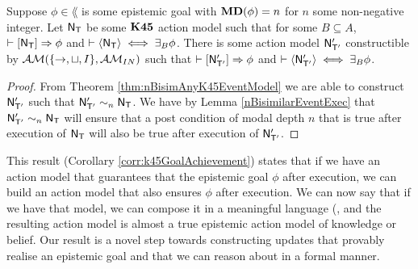 \begin{corr} \label{corr:k45GoalAchievement}
  Suppose $\phi \in \lang$ is some epistemic goal with ${\bf MD}(\phi) = n$ for $n$
  some non-negative integer.
  Let $\mathrm{\mathsf{N}}_\mathrm{\mathsf{T}}$ be some $\bf K45$ action model such that for some $B
  \subseteq A$, $\vdash [{\mathrm{\mathsf{N}}_\mathrm{\mathsf{T}}}] \Rightarrow \phi$ and $\vdash
  \langle { \ensuremath {\mathrm{\mathsf{N}}} _ \ensuremath {\mathrm{\mathsf{T}}} } \rangle \iff \exists_B \phi$.
	There is some action model $\mathrm{\mathsf{N}}'_{\mathrm{\mathsf{T}}'}$ constructible by $\mathcal{AM}(\{\to,\sqcup,I\}, \mathcal{AM}_{IN})$
  such that $\vdash [{\mathrm{\mathsf{N}}'_{\mathrm{\mathsf{T}}'}}] \Rightarrow \phi$ and $\vdash
  \langle { \ensuremath {\mathrm{\mathsf{N}}} '_{ \ensuremath {\mathrm{\mathsf{T}}} '}} \rangle \iff \exists_B \phi$.
\end{corr}
\begin{proof}
  From Theorem \ref{thm:nBisimAnyK45EventModel} we are able to construct
  $\mathrm{\mathsf{N}}'_{\mathrm{\mathsf{T}}'}$ such that $\mathrm{\mathsf{N}}'_{\mathrm{\mathsf{T}}'} \sim_n \mathrm{\mathsf{N}}_\mathrm{\mathsf{T}}$.
  We have by Lemma \ref{nBisimilarEventExec} that $\mathrm{\mathsf{N}}'_{\mathrm{\mathsf{T}}'} \sim_n
  \mathrm{\mathsf{N}}_\mathrm{\mathsf{T}}$ will ensure that a post condition of modal depth $n$ that is true
  after execution of $\mathrm{\mathsf{N}}_\mathrm{\mathsf{T}}$ will also be true after execution of
  $\mathrm{\mathsf{N}}'_{\mathrm{\mathsf{T}}'}$.
\end{proof}

This result (Corollary \ref{corr:k45GoalAchievement}) states
that if we have an action model that guarantees that the epistemic goal $\phi$ after execution, 
we can build an action model that also ensures $\phi$ after execution.
We can now say that if we have that model, we can compose it in a meaningful language (, and the
resulting action model is almost a true epistemic action model of knowledge or belief.
Our result is a novel step towards constructing updates that provably realise an epistemic goal and
that we can reason about in a formal manner.
